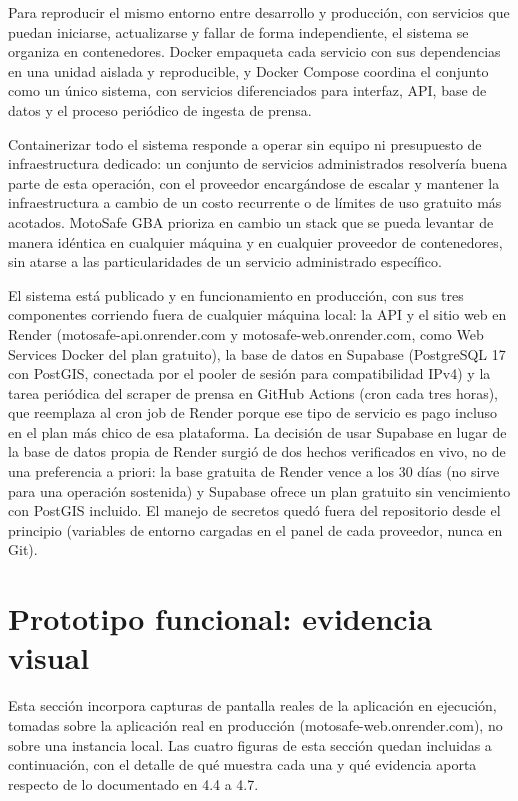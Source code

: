 Para reproducir el mismo entorno entre desarrollo y producción, con
servicios que puedan iniciarse, actualizarse y fallar de forma
independiente, el sistema se organiza en contenedores. Docker empaqueta
cada servicio con sus dependencias en una unidad aislada y reproducible,
y Docker Compose coordina el conjunto como un único sistema, con
servicios diferenciados para interfaz, API, base de datos y el proceso
periódico de ingesta de prensa.

Containerizar todo el sistema responde a operar sin equipo ni
presupuesto de infraestructura dedicado: un conjunto de servicios
administrados resolvería buena parte de esta operación, con el proveedor
encargándose de escalar y mantener la infraestructura a cambio de un
costo recurrente o de límites de uso gratuito más acotados. MotoSafe GBA
prioriza en cambio un stack que se pueda levantar de manera idéntica en
cualquier máquina y en cualquier proveedor de contenedores, sin atarse a
las particularidades de un servicio administrado específico.

El sistema está publicado y en funcionamiento en producción, con sus
tres componentes corriendo fuera de cualquier máquina local: la API y el
sitio web en Render (motosafe-api.onrender.com y
motosafe-web.onrender.com, como Web Services Docker del plan gratuito),
la base de datos en Supabase (PostgreSQL 17 con PostGIS, conectada por
el pooler de sesión para compatibilidad IPv4) y la tarea periódica del
scraper de prensa en GitHub Actions (cron cada tres horas), que
reemplaza al cron job de Render porque ese tipo de servicio es pago
incluso en el plan más chico de esa plataforma. La decisión de usar
Supabase en lugar de la base de datos propia de Render surgió de dos
hechos verificados en vivo, no de una preferencia a priori: la base
gratuita de Render vence a los 30 días (no sirve para una operación
sostenida) y Supabase ofrece un plan gratuito sin vencimiento con
PostGIS incluido. El manejo de secretos quedó fuera del repositorio
desde el principio (variables de entorno cargadas en el panel de cada
proveedor, nunca en Git).

\section{Prototipo funcional: evidencia visual}

Esta sección incorpora capturas de pantalla reales de la aplicación en
ejecución, tomadas sobre la aplicación real en producción
(motosafe-web.onrender.com), no sobre una instancia local. Las cuatro
figuras de esta sección quedan incluidas a continuación, con el detalle
de qué muestra cada una y qué evidencia aporta respecto de lo
documentado en 4.4 a 4.7.

